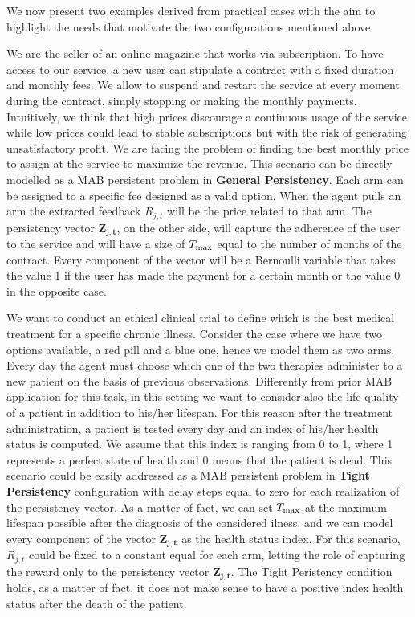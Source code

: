 We now present two examples derived from practical cases with the aim to highlight the needs that motivate the two configurations mentioned above. 
\begin{example}
	We are the seller of an online magazine that works via subscription. To have access to our service, a new user can stipulate a contract with a fixed duration and monthly fees. We allow to suspend and restart the service at every moment during the contract, simply stopping or making the monthly payments. Intuitively, we think that high prices discourage a continuous usage of the service while low prices could lead to stable subscriptions but with the risk of generating unsatisfactory profit. We are facing the problem of finding the best monthly price to assign at the service to maximize the revenue. This scenario can be directly modelled as a MAB persistent problem in \textbf{General Persistency}. Each arm can be assigned to a specific fee designed as a valid option. When the agent pulls an arm the extracted feedback $R_{j,t}$ will be the price related to that arm. The persistency vector $\boldsymbol{Z_{j,t}}$, on the other side, will capture the adherence of the user to the service and will have a size of $T_{\textnormal{max}}$ equal to the number of months of the contract. Every component of the vector will be a Bernoulli variable that takes the value 1 if the user has made the payment for a certain month or the value 0 in the opposite case.
	\label{magazine}
\end{example}
\begin{example}
	\label{trial}
	We want to conduct an ethical clinical trial to define which is the best medical treatment for a specific chronic illness. Consider the case where we have two options available, a red pill and a blue one, hence we model them as two arms. Every day the agent must choose which one of the two therapies administer to a new patient on the basis of previous observations. Differently from prior MAB application for this task, in this setting we want to consider also the life quality of a patient in addition to his/her lifespan. For this reason after the treatment administration, a patient is tested every day and an index of his/her health status is computed. We assume that this index is ranging from 0 to 1, where 1 represents a perfect state of health and 0 means that the patient is dead. This scenario could be easily addressed as a MAB persistent problem in \textbf{Tight Persistency} configuration with delay steps equal to zero for each realization of the persistency vector. As a matter of fact, we can set $T_{\textnormal{max}}$ at the maximum lifespan possible after the diagnosis of the considered ilness, and we can model every component of the vector $\boldsymbol{ Z_ {j, t}} $ as the health status index. For this scenario, $R_{j,t}$ could be fixed to a constant equal for each arm, letting the role of capturing the reward only to the persistency vector $\boldsymbol{ Z_ {j, t}}$. The Tight Peristency condition holds, as a matter of fact, it does not make sense to have a positive index health status after the death of the patient. 
\end{example}

